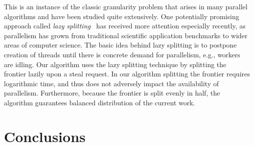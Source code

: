 This is an instance of the classic granularity problem that arises in
many parallel algorithms and have been studied quite extensively.  One
potentially promising approach called {\em lazy
  splitting}~\cite{mohr-lazy-1991,GoldsteinScCu95,goldstein96,frigolera98,backtracking-based-load-balancing,tcvb-lazy-scheduling-14}
has received more attention especially recently, as parallelism has
grown from traditional scientific application benchmarks to wider
areas of computer science.
%
The basic idea behind lazy splitting is to postpone creation of
threads until there is concrete demand for parallelism, e.g., workers
are idling.
%
Our algorithm uses the lazy splitting technique by splitting the
frontier lazily upon a steal request. In our algorithm splitting the
frontier requires logarithmic time, and thus does not adversely impact
the availability of parallelism.
%
Furthermore, because the frontier is
split evenly in half, the algorithm guarantees balanced distribution
of the current work.




%
\section{Conclusions}


